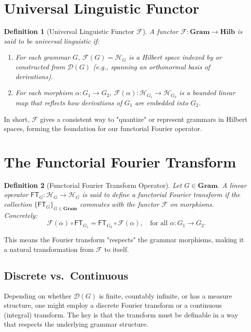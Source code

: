 \documentclass[11pt]{article}
\newtheorem{definition}{Definition}[section]
\begin{document}
\section{Universal Linguistic Functor}
\begin{definition}[Universal Linguistic Functor \(\mathcal{F}\)]
A functor \(\mathcal{F}: \mathbf{Gram} \to \mathbf{Hilb}\) is said to be \emph{universal linguistic} if:
\begin{enumerate}
    \item For each grammar \(G\), \(\mathcal{F}(G) = \mathcal{H}_G\) is a Hilbert space indexed by or constructed from \(\mathcal{D}(G)\) (e.g., spanning an orthonormal basis of derivations).
    \item For each morphism \(\alpha: G_1 \to G_2\), \(\mathcal{F}(\alpha) : \mathcal{H}_{G_1} \to \mathcal{H}_{G_2}\) is a bounded linear map that reflects how derivations of \(G_1\) are embedded into \(G_2\).
\end{enumerate}
\end{definition}

In short, \(\mathcal{F}\) gives a consistent way to "quantize" or represent grammars in Hilbert spaces, forming the foundation for our functorial Fourier operator.

\section{The Functorial Fourier Transform}
\label{sec:fft-functor}
\begin{definition}[Functorial Fourier Transform Operator]
Let \(G\in \mathbf{Gram}\). A linear operator \(\mathsf{FT}_G : \mathcal{H}_G \to \mathcal{H}_G\) is said to define a \emph{functorial Fourier transform} if the collection \(\{\mathsf{FT}_G\}_{G\in \mathbf{Gram}}\) commutes with the functor \(\mathcal{F}\) on morphisms. Concretely:
\[
\mathcal{F}(\alpha) \circ \mathsf{FT}_{G_1} = \mathsf{FT}_{G_2} \circ \mathcal{F}(\alpha), \quad \text{for all } \alpha : G_1 \to G_2.
\]
\end{definition}

This means the Fourier transform "respects" the grammar morphisms, making it a natural transformation from \(\mathcal{F}\) to itself.

\subsection{Discrete vs.~Continuous}
Depending on whether \(\mathcal{D}(G)\) is finite, countably infinite, or has a measure structure, one might employ a discrete Fourier transform or a continuous (integral) transform. The key is that the transform must be definable in a way that respects the underlying grammar structure.
\end{document}
